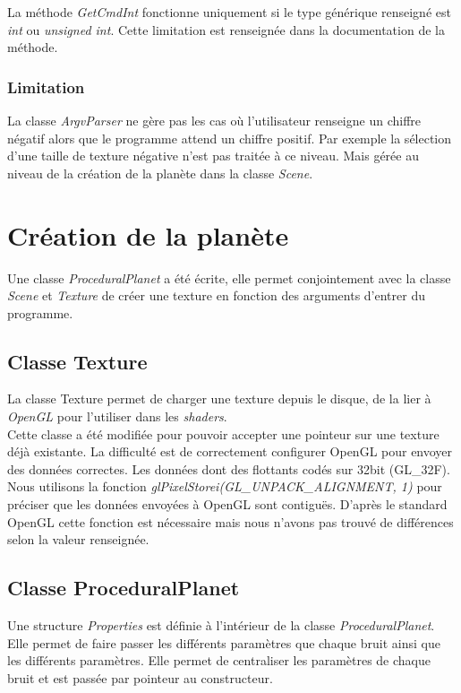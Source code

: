     La méthode \textit{GetCmdInt} fonctionne uniquement si le type générique renseigné est \textit{int} ou \textit{unsigned int}. Cette limitation est renseignée dans la documentation de la méthode.
    
  \subsubsection{Limitation}
    
    La classe \textit{ArgvParser} ne gère pas les cas où l'utilisateur renseigne un chiffre négatif alors que le programme attend un chiffre positif. Par exemple la sélection d'une taille de texture négative
    n'est pas traitée à ce niveau. Mais gérée au niveau de la création de la planète dans la classe \textit{Scene}.
  
  \section{Création de la planète}
  Une classe \textit{ProceduralPlanet} a été écrite, elle permet conjointement avec la classe \textit{Scene} et \textit{Texture} de créer une texture en fonction des arguments d'entrer du programme.
  
  \subsection{Classe Texture}
  \label{sec:class_texture}
  La classe Texture permet de charger une texture depuis le disque, de la lier à \textit{OpenGL} pour l'utiliser dans les \textit{shaders}.\\
  
  Cette classe a été modifiée pour pouvoir accepter une pointeur sur une texture déjà existante. 
  La difficulté est de correctement configurer OpenGL pour envoyer des données correctes. Les données dont des flottants codés sur 32bit (GL\_32F).\\
  Nous utilisons la fonction \textit{glPixelStorei(GL\_UNPACK\_ALIGNMENT, 1)} pour préciser que les données envoyées à OpenGL sont contiguës. D'après le standard OpenGL cette fonction est nécessaire mais 
  nous n'avons pas trouvé de différences selon la valeur renseignée.
  
  \subsection{Classe ProceduralPlanet}
    \label{sec::ProceduralPlanet}
  Une structure \textit{Properties} est définie à l'intérieur de la classe \textit{ProceduralPlanet}. Elle permet de faire passer les différents paramètres que chaque bruit ainsi que les différents paramètres. 
  Elle permet de centraliser les paramètres de chaque bruit et est passée par pointeur au constructeur.
  

